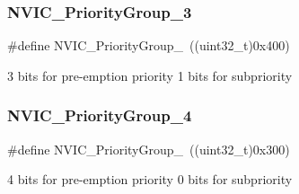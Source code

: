 \subsubsection{\texorpdfstring{NVIC\_PriorityGroup\_3}{NVIC\_PriorityGroup\_3}}
{\footnotesize\ttfamily \#define N\+V\+I\+C\+\_\+\+Priority\+Group\+\_~((uint32\+\_\+t)0x400)}

3 bits for pre-\/emption priority 1 bits for subpriority \mbox{\label{group___preemption___priority___group_gaf9020c585da2a299328f0b06dee391a2}} 
\subsubsection{\texorpdfstring{NVIC\_PriorityGroup\_4}{NVIC\_PriorityGroup\_4}}
{\footnotesize\ttfamily \#define N\+V\+I\+C\+\_\+\+Priority\+Group\+\_~((uint32\+\_\+t)0x300)}

4 bits for pre-\/emption priority 0 bits for subpriority 